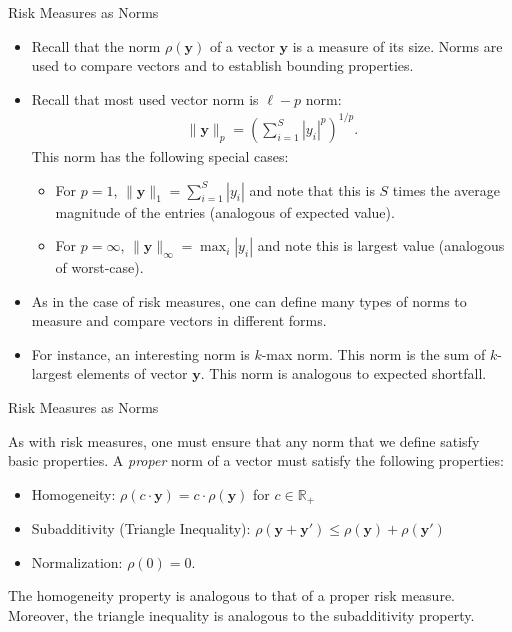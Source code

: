 \documentclass[handout,9pt]{beamer}
\begin{document}
%
\begin{frame}{Risk Measures as Norms}

\begin{itemize}
\setlength{\itemsep}{10pt}
\item Recall that the norm $\rho(\mathbf{y})$ of a vector $\mathbf{y}$ is a measure of its size. Norms are used to compare vectors and to establish bounding properties.   

\item Recall that most used vector norm is $\ell-p$ norm:
\begin{align*}
\|\mathbf{y}\|_p=\left(\sum_{i=1}^S|y_i|^p\right)^{1/p}.
\end{align*}
This norm has the following special cases:
\begin{itemize}
\setlength{\itemsep}{10pt}
\item For $p=1$, $\|\mathbf{y}\|_1=\sum_{i=1}^S|y_i|$ and note that this is $S$ times the average magnitude of the entries (analogous of expected value). 
\item For $p=\infty$, $\|\mathbf{y}\|_\infty=\max_{i} |y_i|$ and note this is largest value (analogous of worst-case). 
\end{itemize}
\item As in the case of risk measures, one can define many types of norms to measure and compare vectors in different forms. 

\item For instance, an interesting norm is $k$-max norm. This norm is the sum of $k$-largest elements of vector $\mathbf{y}$. This norm is analogous to expected shortfall.   
\end{itemize}

\end{frame}


%
\begin{frame}{Risk Measures as Norms}

As with risk measures, one must ensure that any norm that we define satisfy basic properties.  A {\em proper} norm of a vector must satisfy the following properties:

\begin{itemize}
\setlength{\itemsep}{10pt}
\item Homogeneity: $\rho(c\cdot \mathbf{y})=c\cdot \rho(\mathbf{y})$ for $c\in \mathbb{R}_+$
\item Subadditivity (Triangle Inequality): $\rho(\mathbf{y}+\mathbf{y}')\leq \rho(\mathbf{y})+\rho(\mathbf{y}')$
\item Normalization: $\rho(0)=0$.
\end{itemize}
The homogeneity property is analogous to that of a proper risk measure. Moreover, the triangle inequality is analogous to the  subadditivity property. 

\end{frame}
\end{document}
